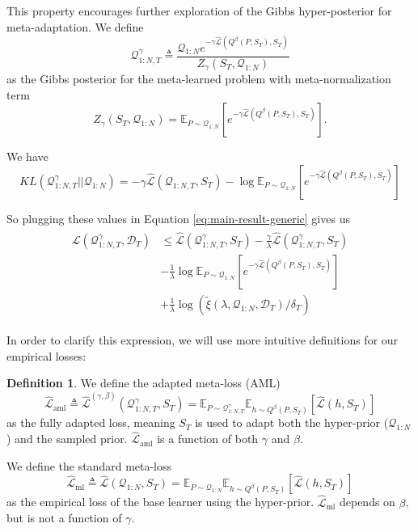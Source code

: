 \documentclass{article}
\theoremstyle{definition}
\newtheorem{defn}{Definition}[section]
\newcommand{\Expect}[2]{\mathbb{E}_{#1}\left [#2 \right ]}
\begin{document}
This property encourages further exploration of the Gibbs hyper-posterior for meta-adaptation. We define 
\begin{equation} \label{eq:aml-post-defn}
\mathcal{Q}^{\gamma}_{1:N,T}\triangleq \frac{\mathcal{Q}_{1:N}e^{-\gamma\hat{\mathcal{L}}(Q^\beta(P,S_T),S_T)}}{Z_\gamma(S_T, \mathcal{Q}_{1:N})}
\end{equation} 
as the Gibbs posterior for the meta-learned problem with meta-normalization term $$Z_\gamma(S_T, \mathcal{Q}_{1:N})=\Expect{P\sim \mathcal{Q}_{1:N}}{e^{-\gamma\hat{\mathcal{L}}(Q^\beta(P,S_T),S_T)}}.$$

We have 
$$KL(\mathcal{Q}^{\gamma}_{1:N,T}||\mathcal{Q}_{1:N})=
-\gamma\hat{\mathcal{L}}(\mathcal{Q}_{1:N,T}, S_T)-\log\Expect{P\sim \mathcal{Q}_{1:N}}{e^{-\gamma\hat{\mathcal{L}}(Q^\beta(P,S_T),S_T)}}$$ 

So plugging these values in Equation \ref{eq:main-result-generic} gives us
\begin{align*} 
\begin{split}
\mathcal{L}(\mathcal{Q}^{\gamma}_{1:N,T}, \mathcal{D}_T) & \leq \hat{\mathcal{L}}(\mathcal{Q}^{\gamma}_{1:N,T}, S_T) -\frac{\gamma}{\lambda}\hat{\mathcal{L}}(\mathcal{Q}^{\gamma}_{1:N,T}, S_T) \\ &- \frac{1}{\lambda}\log\Expect{P\sim \mathcal{Q}_{1:N}}{e^{-\gamma\hat{\mathcal{L}}(Q^\beta(P,S_T),S_T)}}\\ &+\frac{1}{\lambda}\log\left (\tilde{\xi}(\lambda,\mathcal{Q}_{1:N},\mathcal{D}_T)/\delta_T\right )
\end{split}
\end{align*}

In order to clarify this expression, we will use more intuitive definitions for our empirical losses:
\begin{defn}
	We define the adapted meta-loss (AML) $$\hat{\mathcal{L}}_{\mathrm{aml}}\triangleq \hat{\mathcal{L}}^{(\gamma,\beta)}(\mathcal{Q}^{\gamma}_{1:N,T}, S_T)=\mathbb{E}_{P\sim \mathcal{Q}^{\gamma}_{1:N,T}}\mathbb{E}_{h\sim Q^{\beta}(P,S_T)}\left [\hat{\mathcal{L}}(h, S_T)\right ]$$ as the fully adapted loss, meaning $S_T$ is used to adapt both the hyper-prior ($\mathcal{Q}_{1:N}$) and the sampled prior. $\hat{\mathcal{L}}_{\mathrm{aml}}$ is a function of both $\gamma$ and $\beta$. 
	
	We define the standard meta-loss $$\hat{\mathcal{L}}_{\mathrm{ml}}\triangleq \hat{\mathcal{L}}(\mathcal{Q}_{1:N}, S_T)=\mathbb{E}_{P\sim \mathcal{Q}_{1:N}}\mathbb{E}_{h\sim Q^{\beta}(P,S_T)}\left [\hat{\mathcal{L}}(h, S_T)\right ]$$ as the empirical loss of the base learner using the hyper-prior. $\hat{\mathcal{L}}_{\mathrm{ml}}$ depends on $\beta$, but is not a function of $\gamma$.
\end{defn}
\end{document}
